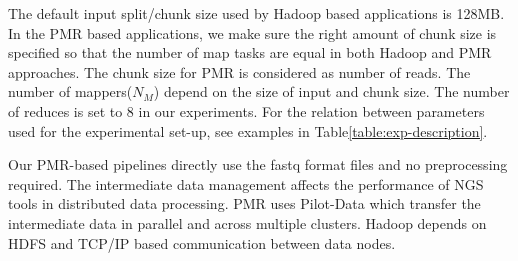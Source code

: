 \documentclass{acm_proc_article-sp}
\begin{document}
The default input split/chunk size used by Hadoop based applications
is 128MB. In the PMR based applications, we make sure the right amount
of chunk size is specified so that the number of map tasks are equal
in both Hadoop and PMR approaches. The chunk size for PMR is
considered as number of reads. The number of mappers($N_M$) depend on
the size of input and chunk size. The number of reduces
is set to 8 in our experiments. For the relation between parameters
used for the experimental set-up, see examples in
Table\ref{table:exp-description}.

Our PMR-based pipelines directly use the fastq format files and no
preprocessing required.  The intermediate data management affects the
performance of NGS tools in distributed data processing. PMR uses
Pilot-Data which transfer the intermediate data in parallel and across
multiple clusters. Hadoop depends on HDFS and TCP/IP based
communication between data nodes.


\end{document}
